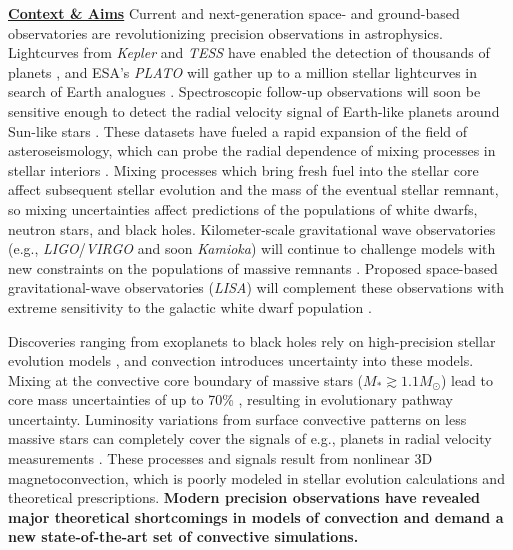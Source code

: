 \documentclass[12pt]{article}
\newcommand{\sct}[1]{\vspace{0.3cm}\hspace{-\parindent}\textbf{\underline{#1}}\hspace{0.3cm}}
\begin{document}
\thispagestyle{fancy}

\sct{Context \& Aims}
Current and next-generation space- and ground-based observatories are revolutionizing precision observations in astrophysics.
Lightcurves from \emph{Kepler} and \emph{TESS} \citep{ricker_etal_2016} have enabled the detection of thousands of planets \citep{huang_etal_2020}, and
ESA's \emph{PLATO} will gather up to a million stellar lightcurves in search of Earth analogues \citep{montalto_etal_2021}.
Spectroscopic follow-up observations will soon be sensitive enough to detect the radial velocity signal of Earth-like planets around Sun-like stars \citep[$\sim 10$ cm/s,][]{crass_etal_2021}.
These datasets have fueled a rapid expansion of the field of asteroseismology, which can probe the radial dependence of mixing processes in stellar interiors \citep[][]{pedersen_etal_2021}.
Mixing processes which bring fresh fuel into the stellar core affect subsequent stellar evolution and the mass of the eventual stellar remnant, so mixing uncertainties affect predictions of the populations of white dwarfs, neutron stars, and black holes.
Kilometer-scale gravitational wave observatories (e.g., \emph{LIGO}/\emph{VIRGO} and soon \emph{Kamioka}) will continue to challenge models with new constraints on the populations of massive remnants \citep{abbott_etal_2018}.
Proposed space-based gravitational-wave observatories (\emph{LISA}) will complement these observations with extreme sensitivity to the galactic white dwarf population \citep{robson_etal_2019}.


Discoveries ranging from exoplanets to black holes rely on high-precision stellar evolution models \citep{mesa6}, and convection introduces uncertainty into these models.
Mixing at the convective core boundary of massive stars ($M_* \gtrsim 1.1 M_\odot$) lead to core mass uncertainties of up to 70\% \citep{kaiser_etal_2020}, resulting in evolutionary pathway uncertainty.
Luminosity variations from surface convective patterns on less massive stars can completely cover the signals of e.g., planets in radial velocity measurements \citep{crass_etal_2021}.
These processes and signals result from nonlinear 3D magnetoconvection, which is poorly modeled in stellar evolution calculations and theoretical prescriptions.
\textbf{Modern precision observations have revealed major theoretical shortcomings in models of convection and demand a new state-of-the-art set of convective simulations. }
\end{document}
